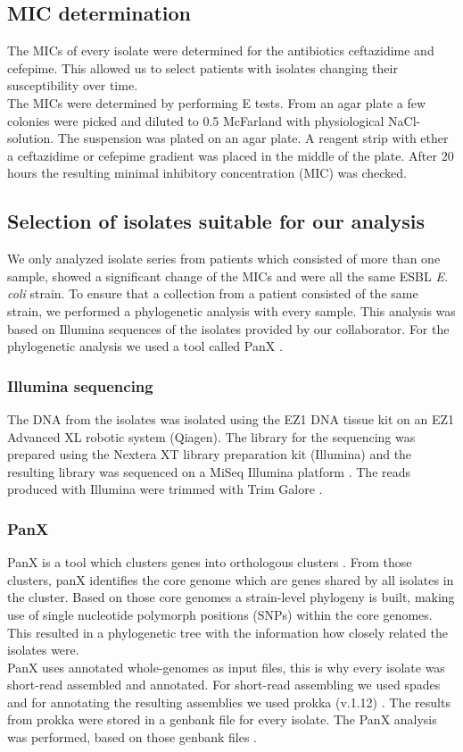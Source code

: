 \subsection{MIC determination}
The MICs of every isolate were determined for the antibiotics ceftazidime and cefepime. This allowed us to select patients with isolates changing their susceptibility over time. \\
The MICs were determined by performing E tests. From an agar plate a few colonies were picked and diluted to 0.5 McFarland with physiological NaCl-solution. The suspension was plated on an agar plate. A reagent strip with ether a ceftazidime or cefepime gradient was placed in the middle of the plate. After 20 hours the resulting minimal inhibitory concentration (MIC) was checked.

\subsection{Selection of isolates suitable for our analysis}
We only analyzed isolate series from patients which consisted of more than one sample, showed a significant change of the MICs and were all the same ESBL \textit{E. coli} strain. To ensure that a collection from a patient consisted of the same strain, we performed a phylogenetic analysis with every sample. This analysis was based on Illumina sequences of the isolates provided by our collaborator. For the phylogenetic analysis we used a tool called PanX \cite{ding_panx:_2018}.

\subsubsection{Illumina sequencing}
The DNA from the isolates was isolated using the EZ1 DNA tissue kit on an EZ1 Advanced XL robotic system (Qiagen). The library for the sequencing was prepared using the Nextera XT library preparation kit (Illumina) and the resulting library was sequenced on a MiSeq Illumina platform \cite{nanopore}. The reads produced with Illumina were trimmed with Trim Galore \cite{noauthor_babraham_nodate}.
\label{section:illumina}

\subsubsection{PanX}
PanX is a tool which clusters genes into orthologous clusters \cite{panx}. From those clusters, panX identifies the core genome which are genes shared by all isolates in the cluster. Based on those core genomes a strain-level phylogeny is built, making use of single nucleotide polymorph positions (SNPs) within the core genomes. This resulted in a phylogenetic tree with the information how closely related the isolates were. \\ 
PanX uses annotated whole-genomes as input files, this is why every isolate was short-read assembled and annotated. For short-read assembling we used spades and for annotating the resulting assemblies we used prokka (v.1.12)  \cite{nurk_assembling_2013} \cite{seemann_prokka:_2014}. The results from prokka were stored in a genbank file for every isolate. The PanX analysis was performed, based on those genbank files . \\

